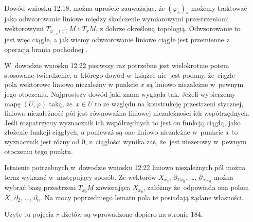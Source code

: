 \documentclass[a4paper,11pt]{article}
\numberwithin{equation}{section}
\begin{document}
\vspace{\spaceFour}





\noindent
{} Dowód wniosku 12.18, można uprościć zauważając, że
$( \varphi_{ s } )_{ * }$ możemy traktować jako odwzorowanie
liniowe między skończenie wymiarowymi przestrzeniami wektorowymi
$T_{ \varphi_{ -s }( x ) }M$ i $T_{ x }M$, z dobrze określoną
topologią. Odwzorowanie to jest więc ciągłe, a jak wiemy
odwzorowanie liniowe ciągłe jest przemienne z operacją brania
pochodnej \cite{LSKAMI}.

\vspace{\spaceFour}





\noindent
{} W~dowodzie wniosku 12.22 pierwszy raz potrzebne jest
wielokrotnie potem stosowane twierdzenie, a~którego dowód w~książce
nie~jest podany, że~ciągłe pola wektorowe liniowo niezależny w punkcie
$x$ są liniowo niezależne w~pewnym jego otoczeniu. Najprostszy dowód
jaki znam wygląda tak. Jeżeli wybierzemy mapę $( U, \varphi )$ taką,
że~$x \in U$ to ze względu na konstrukcję przestrzeni stycznej,
liniowa niezależność pól jest równoważna liniowej niezależności ich
współrzędnych. Jeśli rozpatrzymy wyznacznik ich współrzędnych to jest
on funkcją ciągłą, jako złożenie funkcji ciągłych, a ponieważ są one
liniowo niezależne w~punkcie $x$ to wyznacznik jest różny od 0,
z~ciągłości wynika zaś, że~jest niezerowy w~pewnym otoczeniu tego
punktu.

\vspace{\spaceFour}





\noindent
{} Istnienie potrzebnych w~dowodzie wniosku 12.22 liniowo
niezależnych pól można teraz wykazać w~następujący sposób. Ze
wektorów $X_{ x_{ 0 } }$, $\partial_{ 1 | { x_{ 0 } } }$, \ldots,
$\partial_{ n | { x_{ 0 } } }$ można wybrać bazę przestrzeni
$T_{ { x_{ 0 } } }M$ zawierająca $X_{ { x_{ 0 } } }$, załóżmy
że~odpowiada ona polom $X$, $\partial_{ 2 }$, \ldots,
$\partial_{ n }$. Na mocy poprzedniego lematu pola te posiadają żądane
własności.

\vspace{\spaceFour}





\noindent
{} Użyte tu pojęcia $r$-dżetów są wprowadzone dopiero na stronie 184.
\end{document}
